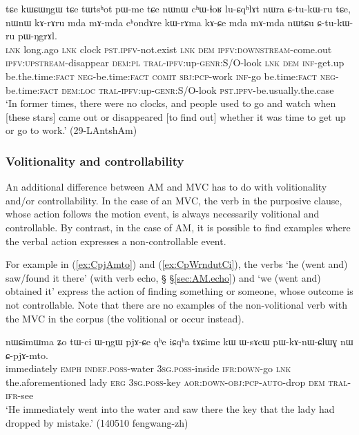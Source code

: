  \begin{exe}
\ex \label{ex:kWrAma.kACe}
\gll  tɕe kɯɕɯŋgɯ tɕe tɯtsʰot pɯ-me tɕe  nɯnɯ cʰɯ-ɬoʁ lu-ɕqʰlɤt nɯra ɕ-tu-kɯ-ru tɕe, nɯnɯ kɤ-rɤru mda mɤ-mda cʰondɤre kɯ-rɤma kɤ-ɕe mda mɤ-mda nɯtɕu ɕ-tu-kɯ-ru pɯ-ŋgrɤl. \\
 \textsc{lnk} long.ago \textsc{lnk} clock \textsc{pst}.\textsc{ipfv}-not.exist \textsc{lnk} \textsc{dem} \textsc{ipfv}:\textsc{downstream}-come.out \textsc{ipfv}:\textsc{upstream}-disappear \textsc{dem}:\textsc{pl} \textsc{tral}-\textsc{ipfv}:up-\textsc{genr}:S/O-look \textsc{lnk} \textsc{dem} \textsc{inf}-get.up be.the.time:\textsc{fact} \textsc{neg}-be.time:\textsc{fact} \textsc{comit} \textsc{sbj}:\textsc{pcp}-work \textsc{inf}-go be.time:\textsc{fact} \textsc{neg}-be.time:\textsc{fact} \textsc{dem}:\textsc{loc} \textsc{tral}-\textsc{ipfv}:up-\textsc{genr}:S/O-look \textsc{pst}.\textsc{ipfv}-be.usually.the.case  \\
 \glt  `In former times, there were no clocks, and people used to go and watch when [these stars] came out or disappeared [to find out] whether it was time to get up or go to work.' (29-LAntshAm) 
  \end{exe}
  
\subsubsection{Volitionality and controllability} \label{sec:AM.volitionality}
An additional difference between AM and MVC has to do with volitionality and/or controllability. In the case of an MVC, the verb in the purposive clause, whose action follows the motion event, is always necessarily volitional and controllable. By contrast, in the case of AM, it is possible to find examples where the verbal action expresses a non-controllable event.

For example in (\ref{ex:CpjAmto}) and (\ref{ex:CpWrndutCi}), the verbs  `he (went and) saw/found it there'  (with verb echo, § §\ref{sec:AM.echo})  and  `we (went and) obtained it' express the action of finding something or someone, whose outcome is not controllable. Note that there are no examples of the non-volitional verb  with the MVC in the corpus (the volitional  or  occur instead). 


\begin{exe}
\ex  \label{ex:CpjAmto}
\gll  nɯɕimɯma ʑo tɯ-ci ɯ-ŋgɯ pjɤ-ɕe qʰe iɕqʰa tɤɕime kɯ ɯ-sɤcɯ pɯ-kɤ-nɯ-ɕlɯɣ nɯ ɕ-pjɤ-mto. \\
immediately \textsc{emph} \textsc{indef}.\textsc{poss}-water \textsc{3sg}.\textsc{poss}-inside \textsc{ifr}:\textsc{down}-go \textsc{lnk} the.aforementioned lady \textsc{erg} \textsc{3sg}.\textsc{poss}-key \textsc{aor}:\textsc{down}-\textsc{obj}:\textsc{pcp}-\textsc{auto}-drop \textsc{dem} \textsc{tral}-\textsc{ifr}-see \\
\glt `He immediately went into the water and saw there the key that the lady had dropped by mistake.' (140510 fengwang-zh)
\end{exe}

